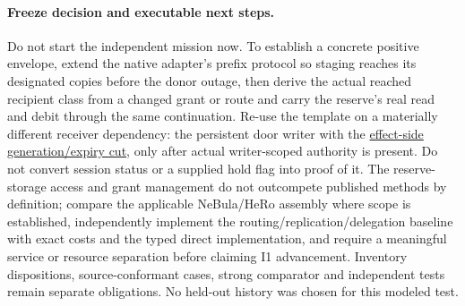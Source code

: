 \documentclass{article}
\begin{document}
\paragraph{Freeze decision and executable next steps.}
Do not start the independent mission now. To establish a concrete positive envelope, extend the native adapter's prefix protocol so staging reaches its designated copies before the donor outage, then derive the actual reached recipient class from a changed grant or route and carry the reserve's real read and debit through the same continuation. Re-use the template on a materially different receiver dependency: the persistent door writer with the \href{https://github.com/eternal-november/eos-research-programmes/pull/830}{effect-side generation/expiry cut}, only after actual writer-scoped authority is present. Do not convert session status or a supplied hold flag into proof of it. The reserve-storage access and grant management do not outcompete published methods by definition; compare the applicable NeBula/HeRo assembly where scope is established, independently implement the routing/replication/delegation baseline with exact costs and the typed direct implementation, and require a meaningful service or resource separation before claiming I1 advancement. Inventory dispositions, source-conformant cases, strong comparator and independent tests remain separate obligations. No held-out history was chosen for this modeled test.
\end{document}
